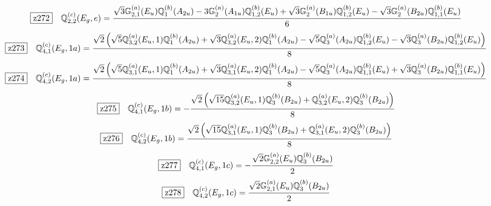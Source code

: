 \documentclass[fleqn,10pt,landscape]{jsarticle}
\begin{document}
\begin{dmath*}
\hspace*{3mm}\fbox{z272}\quad \mathbb{Q}_{2,2}^{(c)}(E_{g},e)=\frac{\sqrt{3} \mathbb{G}_{2,1}^{(a)}(E_{u}) \mathbb{Q}_{1}^{(b)}(A_{2u}) - 3 \mathbb{G}_{2}^{(a)}(A_{1u}) \mathbb{Q}_{1,2}^{(b)}(E_{u}) + \sqrt{3} \mathbb{G}_{2}^{(a)}(B_{1u}) \mathbb{Q}_{1,2}^{(b)}(E_{u}) - \sqrt{3} \mathbb{G}_{2}^{(a)}(B_{2u}) \mathbb{Q}_{1,1}^{(b)}(E_{u})}{6}
\end{dmath*}
\begin{dmath*}
\hspace*{3mm}\fbox{z273}\quad \mathbb{Q}_{4,1}^{(c)}(E_{g},1a)=\frac{\sqrt{2} \left(\sqrt{5} \mathbb{Q}_{3,2}^{(a)}(E_{u},1) \mathbb{Q}_{1}^{(b)}(A_{2u}) + \sqrt{3} \mathbb{Q}_{3,2}^{(a)}(E_{u},2) \mathbb{Q}_{1}^{(b)}(A_{2u}) - \sqrt{5} \mathbb{Q}_{3}^{(a)}(A_{2u}) \mathbb{Q}_{1,2}^{(b)}(E_{u}) - \sqrt{3} \mathbb{Q}_{3}^{(a)}(B_{2u}) \mathbb{Q}_{1,2}^{(b)}(E_{u})\right)}{8}
\end{dmath*}
\begin{dmath*}
\hspace*{3mm}\fbox{z274}\quad \mathbb{Q}_{4,2}^{(c)}(E_{g},1a)=\frac{\sqrt{2} \left(\sqrt{5} \mathbb{Q}_{3,1}^{(a)}(E_{u},1) \mathbb{Q}_{1}^{(b)}(A_{2u}) + \sqrt{3} \mathbb{Q}_{3,1}^{(a)}(E_{u},2) \mathbb{Q}_{1}^{(b)}(A_{2u}) - \sqrt{5} \mathbb{Q}_{3}^{(a)}(A_{2u}) \mathbb{Q}_{1,1}^{(b)}(E_{u}) + \sqrt{3} \mathbb{Q}_{3}^{(a)}(B_{2u}) \mathbb{Q}_{1,1}^{(b)}(E_{u})\right)}{8}
\end{dmath*}
\begin{dmath*}
\hspace*{3mm}\fbox{z275}\quad \mathbb{Q}_{4,1}^{(c)}(E_{g},1b)=- \frac{\sqrt{2} \left(\sqrt{15} \mathbb{Q}_{3,2}^{(a)}(E_{u},1) \mathbb{Q}_{3}^{(b)}(B_{2u}) + \mathbb{Q}_{3,2}^{(a)}(E_{u},2) \mathbb{Q}_{3}^{(b)}(B_{2u})\right)}{8}
\end{dmath*}
\begin{dmath*}
\hspace*{3mm}\fbox{z276}\quad \mathbb{Q}_{4,2}^{(c)}(E_{g},1b)=\frac{\sqrt{2} \left(\sqrt{15} \mathbb{Q}_{3,1}^{(a)}(E_{u},1) \mathbb{Q}_{3}^{(b)}(B_{2u}) + \mathbb{Q}_{3,1}^{(a)}(E_{u},2) \mathbb{Q}_{3}^{(b)}(B_{2u})\right)}{8}
\end{dmath*}
\begin{dmath*}
\hspace*{3mm}\fbox{z277}\quad \mathbb{Q}_{4,1}^{(c)}(E_{g},1c)=- \frac{\sqrt{2} \mathbb{G}_{2,2}^{(a)}(E_{u}) \mathbb{Q}_{3}^{(b)}(B_{2u})}{2}
\end{dmath*}
\begin{dmath*}
\hspace*{3mm}\fbox{z278}\quad \mathbb{Q}_{4,2}^{(c)}(E_{g},1c)=\frac{\sqrt{2} \mathbb{G}_{2,1}^{(a)}(E_{u}) \mathbb{Q}_{3}^{(b)}(B_{2u})}{2}
\end{dmath*}
\end{document}
